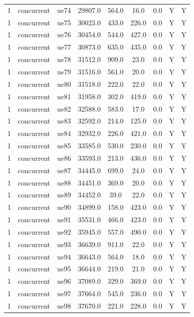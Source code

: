 \begin{table}[ht]
\begin{tabular}{|c|c|c|c|c|c|c|c|c|}
1 & concurrent & ue74 & 29807.0 & 564.0 & 16.0 & 0.0 & Y & Y \\
1 & concurrent & ue75 & 30023.0 & 433.0 & 226.0 & 0.0 & Y & Y \\
1 & concurrent & ue76 & 30454.0 & 544.0 & 427.0 & 0.0 & Y & Y \\
1 & concurrent & ue77 & 30873.0 & 635.0 & 435.0 & 0.0 & Y & Y \\
1 & concurrent & ue78 & 31512.0 & 909.0 & 23.0 & 0.0 & Y & Y \\
1 & concurrent & ue79 & 31516.0 & 561.0 & 20.0 & 0.0 & Y & Y \\
1 & concurrent & ue80 & 31518.0 & 222.0 & 22.0 & 0.0 & Y & Y \\
1 & concurrent & ue81 & 31958.0 & 302.0 & 419.0 & 0.0 & Y & Y \\
1 & concurrent & ue82 & 32588.0 & 583.0 & 17.0 & 0.0 & Y & Y \\
1 & concurrent & ue83 & 32592.0 & 214.0 & 125.0 & 0.0 & Y & Y \\
1 & concurrent & ue84 & 32932.0 & 226.0 & 421.0 & 0.0 & Y & Y \\
1 & concurrent & ue85 & 33585.0 & 530.0 & 230.0 & 0.0 & Y & Y \\
1 & concurrent & ue86 & 33593.0 & 213.0 & 436.0 & 0.0 & Y & Y \\
1 & concurrent & ue87 & 34445.0 & 699.0 & 24.0 & 0.0 & Y & Y \\
1 & concurrent & ue88 & 34451.0 & 369.0 & 20.0 & 0.0 & Y & Y \\
1 & concurrent & ue89 & 34452.0 & 39.0 & 22.0 & 0.0 & Y & Y \\
1 & concurrent & ue90 & 34899.0 & 158.0 & 423.0 & 0.0 & Y & Y \\
1 & concurrent & ue91 & 35531.0 & 466.0 & 423.0 & 0.0 & Y & Y \\
1 & concurrent & ue92 & 35945.0 & 557.0 & 490.0 & 0.0 & Y & Y \\
1 & concurrent & ue93 & 36639.0 & 911.0 & 22.0 & 0.0 & Y & Y \\
1 & concurrent & ue94 & 36643.0 & 564.0 & 18.0 & 0.0 & Y & Y \\
1 & concurrent & ue95 & 36644.0 & 219.0 & 21.0 & 0.0 & Y & Y \\
1 & concurrent & ue96 & 37089.0 & 329.0 & 369.0 & 0.0 & Y & Y \\
1 & concurrent & ue97 & 37664.0 & 545.0 & 236.0 & 0.0 & Y & Y \\
1 & concurrent & ue98 & 37670.0 & 221.0 & 228.0 & 0.0 & Y & Y \\

\end{tabular}
\end{table}
